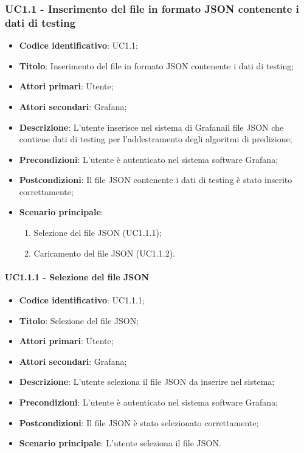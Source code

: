 \subsubsection{UC1.1 - Inserimento del file in formato JSON contenente i dati di testing}
\begin{itemize}
	\item \textbf{Codice identificativo}: UC1.1;
	\item \textbf{Titolo}: Inserimento del file in formato JSON contenente i dati di testing;
	\item \textbf{Attori primari}: Utente;
	\item \textbf{Attori secondari}: Grafana\glo;
	\item \textbf{Descrizione}: L'utente inserisce nel sistema di Grafana\glosp il file JSON che contiene dati di testing per l'addestramento degli algoritmi di predizione;
	\item \textbf{Precondizioni}: L'utente è autenticato nel sistema software Grafana\glosp;
	\item \textbf{Postcondizioni}: Il file JSON contenente i dati di testing è stato inserito correttamente;
	\item \textbf{Scenario principale}:
		\begin{enumerate}
			\item Selezione del file JSON (UC1.1.1);
			\item Caricamento del file JSON (UC1.1.2).
		\end{enumerate}
\end{itemize}

\paragraph{UC1.1.1 - Selezione del file JSON}
\begin{itemize}
	\item \textbf{Codice identificativo}: UC1.1.1;
	\item \textbf{Titolo}: Selezione del file JSON;
	\item \textbf{Attori primari}: Utente;
	\item \textbf{Attori secondari}: Grafana\glo;
	\item \textbf{Descrizione}: L'utente seleziona il file JSON da inserire nel sistema;
	\item \textbf{Precondizioni}: L'utente è autenticato nel sistema software Grafana\glosp;
	\item \textbf{Postcondizioni}: Il file JSON è stato selezionato correttamente;
	\item \textbf{Scenario principale}: L'utente seleziona il file JSON.
\end{itemize}

